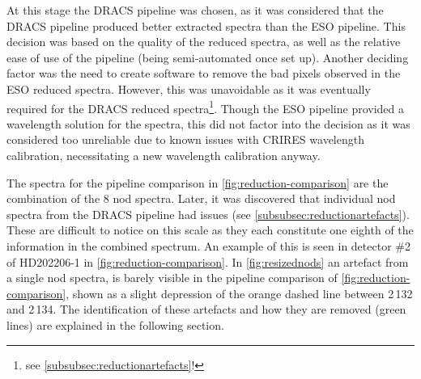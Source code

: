 At this stage the {DRACS} pipeline was chosen, as it was considered that the {DRACS} pipeline produced better extracted spectra than the {ESO} pipeline.
This decision was based on the quality of the reduced spectra, as well as the relative ease of use of the pipeline (being semi-automated once set up).
Another deciding factor was the need to create software to remove the bad pixels observed in the {ESO} reduced spectra.
However, this was unavoidable as it was eventually required for the {DRACS} reduced spectra\footnote{see \cref{subsubsec:reductionartefacts}!}.
Though the {ESO} pipeline provided a wavelength solution for the spectra, this did not factor into the decision as it was considered too unreliable due to known issues with {CRIRES} wavelength calibration, necessitating a new wavelength calibration anyway.

The spectra for the pipeline comparison in \cref{fig:reduction-comparison} are the combination of the 8 nod spectra.
Later, it was discovered that individual nod spectra from the {DRACS} pipeline had issues (see \cref{subsubsec:reductionartefacts}).
These are difficult to notice on this scale as they each constitute one eighth of the information in the combined spectrum.
An example of this is seen in detector \#2 of {HD202206-1} in \cref{fig:reduction-comparison}.
In \cref{fig:resizednods} an artefact from a single nod spectra, is barely visible in the pipeline comparison of \cref{fig:reduction-comparison}, shown as a slight depression of the orange dashed line between 2\,132 and 2\,134\nm{}.
The identification of these artefacts and how they are removed (green lines) are explained in the following section.

